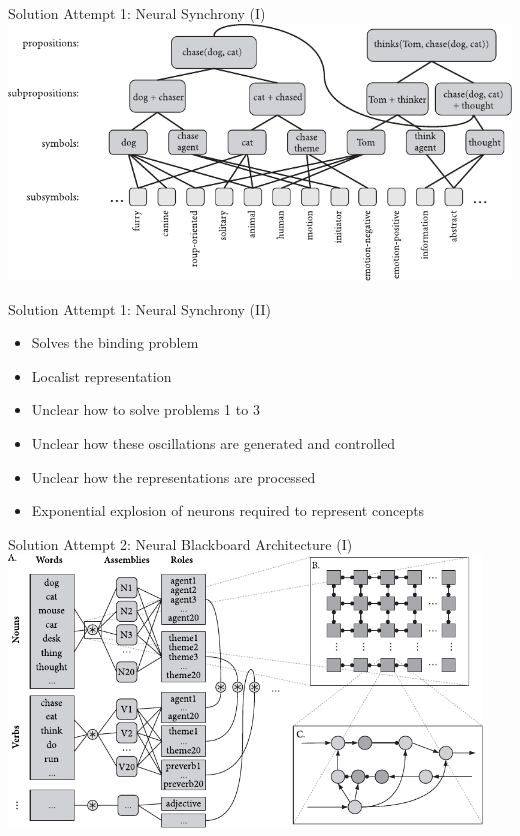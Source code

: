\documentclass[handout,aspectratio=169]{beamer}
\begin{document}
	\begin{frame}{Solution Attempt 1: Neural Synchrony (I)}
		\includegraphics[width=\textwidth]{media/eliasmith_2013_lisa.pdf}
	\end{frame}

	\begin{frame}{Solution Attempt 1: Neural Synchrony (II)}
		\begin{multicols}{2}
			\begin{itemize}
				\setlength{\itemsep}{0.33cm}
				\item[\OPlus] Solves the binding problem
				\item[\OMeh] Localist representation
				\item[\OMeh] Unclear how to solve problems 1 to 3
				\columnbreak
				\item[\OMinus] Unclear how these oscillations are generated and controlled
				\item[\OMinus] Unclear how the representations are processed
				\item[\OMinus] Exponential explosion of neurons required to represent concepts
			\end{itemize}
		\end{multicols}
	\end{frame}

	\begin{frame}{Solution Attempt 2: Neural Blackboard Architecture (I)}
		\centering
		\includegraphics[height=7.25cm]{media/eliasmith_2013_blackboard.pdf}
	\end{frame}
\end{document}
